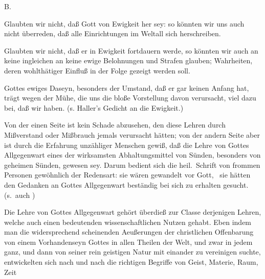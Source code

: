 \vabst B.~
\begin{aufza}
\item Glaubten wir nicht, daß Gott von Ewigkeit her sey: so könnten wir uns auch nicht überreden, daß alle Einrichtungen im Weltall sich  herschreiben.
\item Glaubten wir nicht, daß er in Ewigkeit fortdauern werde, so könnten wir auch an keine  ingleichen an keine ewige Belohnungen und Strafen glauben; Wahrheiten, deren wohlthätiger Einfluß in der Folge gezeigt werden soll.
\item Gottes ewiges Daseyn, besonders der Umstand, daß er gar keinen Anfang hat, trägt wegen der Mühe, die uns die bloße Vorstellung davon verursacht, viel dazu bei, daß wir  haben. (s. Haller's Gedicht an die Ewigkeit.)
\end{aufza}

Von der einen Seite ist kein Schade abzusehen, den diese Lehren durch Mißverstand oder Mißbrauch jemals verursacht hätten; von der andern Seite aber ist durch die Erfahrung unzähliger Menschen gewiß, daß die Lehre von Gottes Allgegenwart eines der wirksamsten Abhaltungsmittel von Sünden, besonders von geheimen Sünden, gewesen sey. Darum bedient sich die heil.\ Schrift von frommen Personen gewöhnlich der Redensart: sie wären gewandelt vor Gott, \dh\ sie hätten den Gedanken an Gottes Allgegenwart beständig bei sich zu erhalten gesucht. (s.~auch )
\begin{RWanm} Die Lehre von Gottes Allgegenwart gehört überdieß zur Classe derjenigen Lehren, welche auch einen bedeutenden wissenschaftlichen Nutzen gehabt. Eben indem man die widersprechend scheinenden Aeußerungen der christlichen Offenbarung von einem Vorhandenseyn Gottes in allen Theilen der Welt, und zwar in jedem ganz, und dann von seiner rein geistigen Natur mit einander zu vereinigen suchte, entwickelten sich nach und nach die richtigen Begriffe von Geist, Materie, Raum, Zeit \usw\ 
\end{RWanm}

